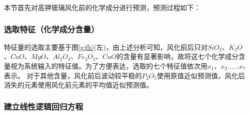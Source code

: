 \documentclass[withoutpreface,bwprint]{cumcmthesis} %
\begin{document}
本节首先对高钾玻璃风化前的化学成分进行预测，预测过程如下：

\subsubsection{选取特征（化学成分含量）}

特征量的选取主要基于图\ref{gjfh}(左)，由上述分析可知，风化前后只对$SiO_{2}$、$K_{2}O$、$CaO$、$MgO$、$Al_{2}O_{3}$、$Fe_{2}O_{3}$、$CuO$的含量有显著影响，故将这七个化学成分含量视为系统输入的特征值。为了方便表达，选取的七个特征值依次用$x_{1}$、$x_{2}$......$x_{7}$表示。 对于其他含量，风化前后波动较平稳的$P_{2}O_{5}$使用原值近似预测值，风化后消失的元素使用风化前元素的平均值近似预测值。


\subsubsection{建立线性逻辑回归方程}
\end{document}
